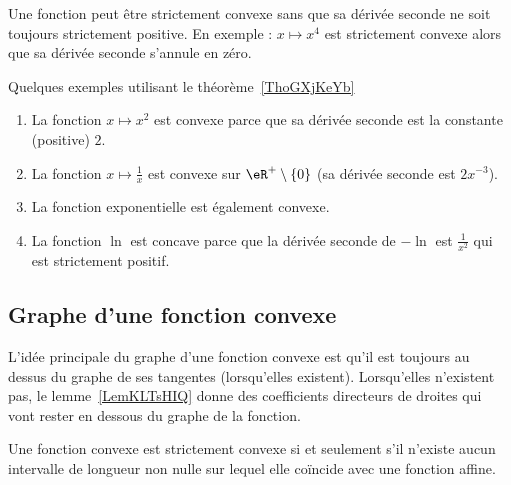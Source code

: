 \begin{remark}      \label{REMooVRPQooIybxmp}
    Une fonction peut être strictement convexe sans que sa dérivée seconde ne soit toujours strictement positive. En exemple : \( x\mapsto x^4\) est strictement convexe alors que sa dérivée seconde s'annule en zéro.
\end{remark}

\begin{example} \label{ExPDRooZCtkOz}
    Quelques exemples utilisant le théorème~\ref{ThoGXjKeYb}
    \begin{enumerate}
        \item
    La fonction \( x\mapsto x^2\) est convexe parce que sa dérivée seconde est la constante (positive) \( 2\).
\item La fonction \( x\mapsto\frac{1}{ x }\) est convexe sur \( \eR^+\setminus\{ 0 \}\) (sa dérivée seconde est \( 2x^{-3}\)).
\item
    La fonction exponentielle est également convexe.
\item
    La fonction \( \ln\) est concave parce que la dérivée seconde de \( -\ln\) est \( \frac{1}{ x^2 }\) qui est strictement positif.
    \end{enumerate}
\end{example}


\subsection{Graphe d'une fonction convexe}

L'idée principale du graphe d'une fonction convexe est qu'il est toujours au dessus du graphe de ses tangentes (lorsqu'elles existent). Lorsqu'elles n'existent pas, le lemme~\ref{LemKLTsHIQ} donne des coefficients directeurs de droites qui vont rester en dessous du graphe de la fonction.

\begin{proposition}      \label{PROPooOCOEooEGybmS}
    Une fonction convexe est strictement convexe si et seulement s'il n'existe aucun intervalle de longueur non nulle sur lequel elle coïncide avec une fonction affine.
\end{proposition}

